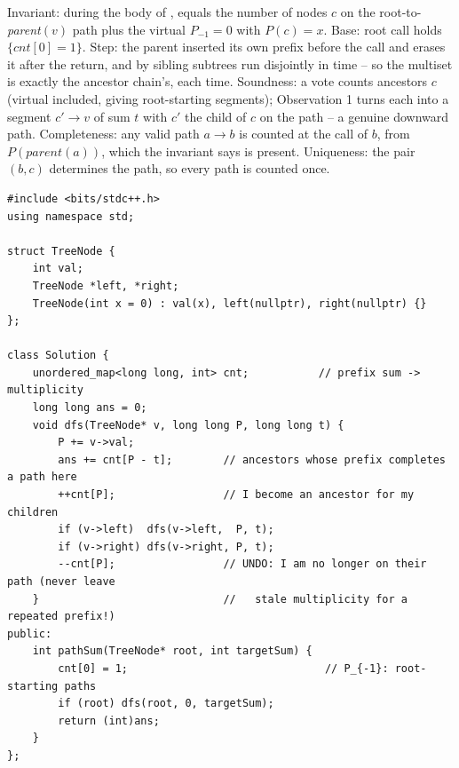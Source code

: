 \begin{proofbox}
Invariant: during the body of ,  equals the number of
nodes $c$ on the root-to-\emph{parent}$(v)$ path plus the virtual $P_{-1}=0$
with $P(c) = x$. Base: root call holds $\{cnt[0]=1\}$. Step: the parent inserted
its own prefix before the call and erases it after the return, and by
 sibling subtrees run disjointly in time -- so the
multiset is exactly the ancestor chain's, each time.
Soundness: a vote  counts ancestors $c$ (virtual included,
giving root-starting segments); Observation 1 turns each into a segment $c' \to
v$ of sum $t$ with $c'$ the child of $c$ on the path -- a genuine downward
path. Completeness: any valid path $a \to b$ is counted at the call of $b$, from
$P(\mathit{parent}(a))$, which the invariant says is present. Uniqueness: the
pair $(b, c)$ determines the path, so every path is counted once.
\end{proofbox}

\begin{lstlisting}[caption={Path Sum III (LeetCode 437) -- prefix hashmap with undo}, label={lst:c02-path-sum-iii}]
#include <bits/stdc++.h>
using namespace std;

struct TreeNode {
    int val;
    TreeNode *left, *right;
    TreeNode(int x = 0) : val(x), left(nullptr), right(nullptr) {}
};

class Solution {
    unordered_map<long long, int> cnt;           // prefix sum -> multiplicity
    long long ans = 0;
    void dfs(TreeNode* v, long long P, long long t) {
        P += v->val;
        ans += cnt[P - t];        // ancestors whose prefix completes a path here
        ++cnt[P];                 // I become an ancestor for my children
        if (v->left)  dfs(v->left,  P, t);
        if (v->right) dfs(v->right, P, t);
        --cnt[P];                 // UNDO: I am no longer on their path (never leave
    }                             //   stale multiplicity for a repeated prefix!)
public:
    int pathSum(TreeNode* root, int targetSum) {
        cnt[0] = 1;                               // P_{-1}: root-starting paths
        if (root) dfs(root, 0, targetSum);
        return (int)ans;
    }
};
\end{lstlisting}


